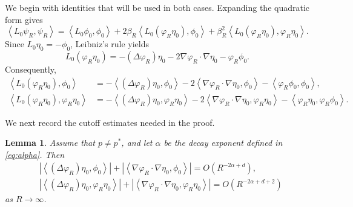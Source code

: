 \documentclass[12pt, a4paper, reqno]{amsart}
\numberwithin{equation}{section}
\newtheorem{lemma}[theorem]{Lemma}
\theoremstyle{definition}
\theoremstyle{remark}
\def\tbra[#1,#2]{{\left\langle #1,#2\right\rangle}}
\def\abs[#1]{{\left\vert #1 \right\vert}}
\begin{document}
We begin with identities that will be used in both cases. Expanding the
quadratic form gives
\begin{equation}\label{eq:qform}
  \tbra[L_0\psi_R,\psi_R]
  =\tbra[L_0\phi_0,\phi_0]
   +2\beta_R\tbra[L_0(\varphi_R\eta_0),\phi_0]
   +\beta_R^2\tbra[L_0(\varphi_R\eta_0),\varphi_R\eta_0].
\end{equation}
Since $L_0\eta_0=-\phi_0$, Leibniz's rule yields
\begin{equation*}
  L_0(\varphi_R\eta_0)
  =-(\Delta\varphi_R)\eta_0
   -2\nabla\varphi_R\cdot\nabla\eta_0
   -\varphi_R\phi_0.
\end{equation*}
Consequently,
{\small
\begin{align}
  \tbra[L_0(\varphi_R\eta_0),\phi_0]
  &={-}\tbra[(\Delta\varphi_R)\eta_0,\phi_0]
    -2\tbra[\nabla\varphi_R\cdot\nabla\eta_0,\phi_0]
    -\tbra[\varphi_R\phi_0,\phi_0],
  \label{eq:mixed}
  \\
  \tbra[L_0(\varphi_R\eta_0),\varphi_R\eta_0]
  &={-}\tbra[(\Delta\varphi_R)\eta_0,\varphi_R\eta_0]
    -2\tbra[\nabla\varphi_R\cdot\nabla\eta_0,\varphi_R\eta_0]
 -\tbra[\varphi_R\eta_0,\varphi_R\phi_0].
  \label{eq:quad}
\end{align}
}%

We next record the cutoff estimates needed in the proof.

\begin{lemma}\label{lem:cut-nc}
Assume that $p\ne p^*$, and let $\alpha$ be the decay exponent defined in
\eqref{eq:alpha}. Then
\begin{align*}
  &\abs[{\tbra[(\Delta\varphi_R)\eta_0,\phi_0]}]
   +\abs[{\tbra[\nabla\varphi_R\cdot\nabla\eta_0,\phi_0]}]
   =O(R^{-2\alpha+d}),
  \\
  &\abs[{\tbra[(\Delta\varphi_R)\eta_0,\varphi_R\eta_0]}]
   +\abs[{\tbra[\nabla\varphi_R\cdot\nabla\eta_0,
                   \varphi_R\eta_0]}]
   =O(R^{-2\alpha+d+2})
\end{align*}
as $R\to\infty$.
\end{lemma}
\end{document}
